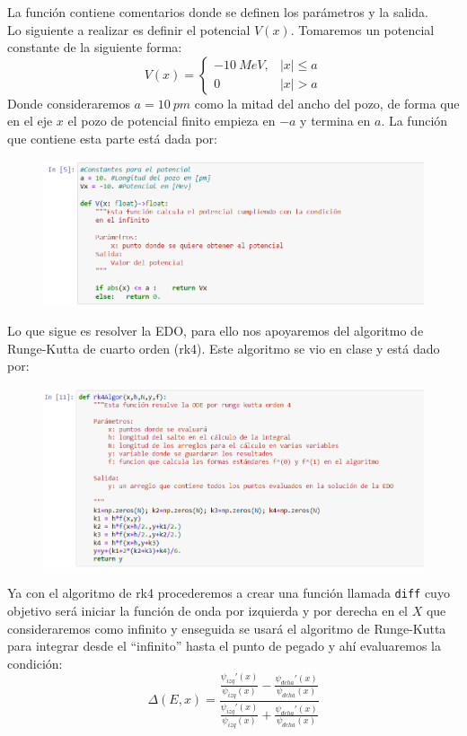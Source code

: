 \documentclass[11pt]{article}
\begin{document}
	La función contiene comentarios donde se definen los parámetros y la salida.\\
	Lo siguiente a realizar es definir el potencial $V(x)$. Tomaremos un potencial constante de la siguiente forma:
	\begin{equation}
		V(x) = \left\{\begin{array}{cc}
				-\SI{10}{MeV}, & |x|\leq a	\\
				0 & |x| > a
		\end{array}\right.
	\end{equation}
	Donde consideraremos $a = \SI{10}{pm}$ como la mitad del ancho del pozo, de forma que en el eje $x$ el pozo de potencial finito empieza en $-a$ y termina en $a$. La función que contiene esta parte está dada por:
	\begin{figure}[h]
		\centering
		\includegraphics[width=13cm]{Img/2.4.PNG}
	\end{figure}

	Lo que sigue es resolver la EDO, para ello nos apoyaremos del algoritmo de Runge-Kutta de cuarto orden (rk4). Este algoritmo se vio en clase y está dado por:
	\begin{figure}[h]
		\centering
		\includegraphics[width=14cm]{Img/2.5.PNG}
	\end{figure}

	Ya con el algoritmo de rk4 procederemos a crear una función llamada \texttt{diff} cuyo objetivo será iniciar la función de onda por izquierda y por derecha en el $X$ que consideraremos como infinito y enseguida se usará el algoritmo de Runge-Kutta para integrar desde el ``infinito'' hasta el punto de pegado y ahí evaluaremos la condición:
	$$\Delta (E,x) =\frac{\frac{\psi_{izq}' (x)}{\psi_{izq} (x)} - \frac{\psi_{dcha}' (x)}{\psi_{dcha} (x)}}{\frac{\psi_{izq}' (x)}{\psi_{izq} (x)} + \frac{\psi_{dcha}' (x)}{\psi_{dcha} (x)}} $$
	
\end{document}
